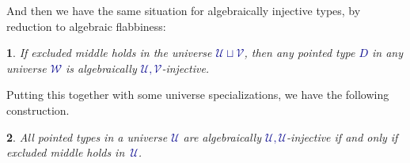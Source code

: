 \documentclass[10pt]{article}
\newcommand{\db}{\textcolor{darkblue}}
\newcommand{\df}[1]{\emph{\db{#1}}}
\newcommand{\m}[1]{\db{$#1$}}
\newcommand{\U}{\mathcal{U}}
\newcommand{\V}{\mathcal{V}}
\newcommand{\W}{\mathcal{W}}
\newcommand{\Zero}{\mathbbm{O}}
\newcommand{\One}{\mathbbm{1}}
\newtheorem{numbered}{}
\theoremstyle{definition}
\begin{document}
\noindent
And then we have the same situation for algebraically injective types,
by reduction to algebraic flabbiness:
\begin{numbered}
  If excluded middle holds in the universe \m{\U \sqcup \V}, then any
  pointed type \m{D} in any universe \m{\W} is algebraically
  \m{\U,\V}-injective.
\end{numbered}
\noindent Putting this together with some universe specializations, we
have the following construction.
\begin{numbered} %
  All pointed types in a universe \m{\U} are algebraically \m{\U,\U}-injective if and only if excluded middle holds in~\m{\U}.
\end{numbered}
\end{document}
